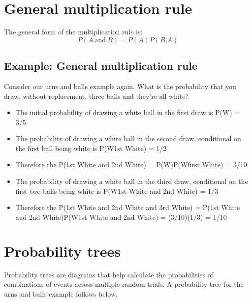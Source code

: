\documentclass[]{book}
\providecommand{\tightlist}{%
  \setlength{\itemsep}{0pt}\setlength{\parskip}{0pt}}
\theoremstyle{definition}
\theoremstyle{definition}
\theoremstyle{definition}
\theoremstyle{remark}
\begin{document}
\hypertarget{general-multiplication-rule}{%
\section{General multiplication
rule}\label{general-multiplication-rule}}

The general form of the multiplication rule is: \[
P(A\ \text{and}\ B) = P(A)P(B|A)
\]

\hypertarget{example-general-multiplication-rule}{%
\subsection{Example: General multiplication
rule}\label{example-general-multiplication-rule}}

Consider our urns and balls example again. What is the probability that
you draw, without replacement, three balls and they're all white?

\begin{itemize}
\tightlist
\item
  The initial probability of drawing a white ball in the first draw is
  P(W) = 3/5
\item
  The probability of drawing a white ball in the second draw,
  conditional on the first ball being white is P(W\textbar{}1st White) =
  1/2
\item
  Therefore the P(1st White and 2nd White) = P(W)P(W\textbar{}first
  White) = 3/10
\item
  The probability of drawing a white ball in the third draw, conditional
  on the first two balls being white is P(W\textbar{}1st White and 2nd
  White) = 1/3
\item
  Therefore the P(1st White and 2nd White and 3rd White) = P(1st White
  and 2nd White)P(W\textbar{}1st White and 2nd White) = (3/10)(1/3) =
  1/10
\end{itemize}

\hypertarget{probability-trees}{%
\section{Probability trees}\label{probability-trees}}

Probability trees are diagrams that help calculate the probabilities of
combinations of events across multiple random trials. A probability tree
for the urns and balls example follows below.
\end{document}
